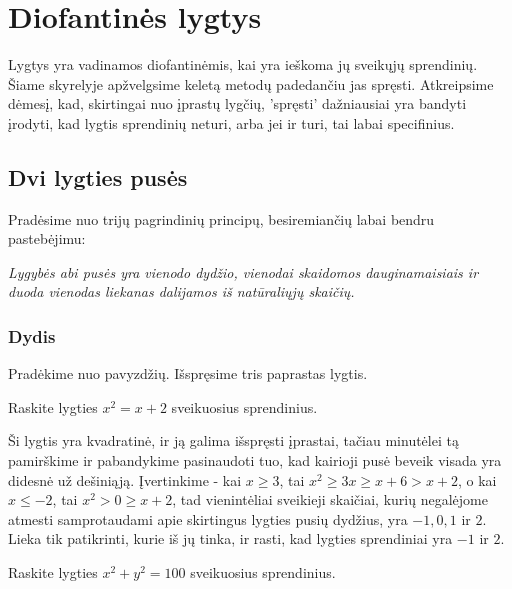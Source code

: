 
\section{Diofantinės lygtys}

Lygtys yra vadinamos diofantinėmis, kai yra ieškoma jų sveikųjų
sprendinių. Šiame skyrelyje apžvelgsime keletą metodų padedančiu jas
spręsti. Atkreipsime dėmesį, kad, skirtingai nuo įprastų lygčių,
'spręsti' dažniausiai yra bandyti įrodyti, kad lygtis sprendinių neturi,
arba jei ir turi, tai labai specifinius.  

\subsection{Dvi lygties pusės}

Pradėsime nuo trijų pagrindinių principų, besiremiančių labai bendru
pastebėjimu:

\smallskip
\begin{center}\emph{Lygybės abi pusės yra vienodo dydžio, vienodai skaidomos
dauginamaisiais ir duoda vienodas liekanas dalijamos iš natūraliųjų
skaičių.}\end{center}
\smallskip

\subsubsection{Dydis}

Pradėkime nuo pavyzdžių. Išspręsime tris paprastas lygtis.
\begin{pav} 
  Raskite lygties $x^2 = x + 2$ sveikuosius sprendinius.
\end{pav}

\begin{sprendimas}
  Ši lygtis yra kvadratinė, ir ją galima išspręsti įprastai, tačiau minutėlei tą
  pamirškime ir pabandykime pasinaudoti tuo, kad kairioji pusė beveik visada yra didesnė
  už dešiniąją. Įvertinkime - kai $x\geq 3$, tai $x^2 \geq 3x \geq x + 6 >
  x+2$, o kai $x\leq -2$, tai $x^2 > 0 \geq x+2$, tad vienintėliai sveikieji
  skaičiai, kurių negalėjome atmesti samprotaudami apie skirtingus lygties
  pusių dydžius, yra $-1, 0, 1$ ir $2$. Lieka tik patikrinti, kurie iš jų
  tinka, ir rasti, kad lygties sprendiniai yra $-1$ ir $2$. 
\end{sprendimas}

\begin{pav}
  Raskite lygties $x^2 + y^2 = 100$ sveikuosius sprendinius.
\end{pav}

